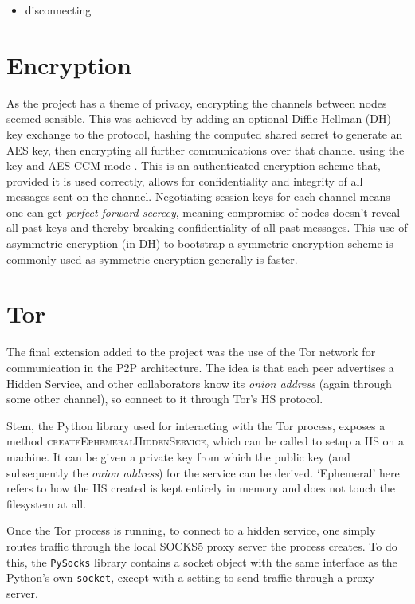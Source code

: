 \documentclass[diss.tex]{subfiles}
\begin{document}
\begin{itemize}
\item disconnecting
\end{itemize}

\section{Encryption}
As the project has a theme of privacy, encrypting the channels between nodes seemed sensible. This was achieved by adding an optional Diffie-Hellman (DH) key exchange \cite{DH} to the protocol, hashing the computed shared secret to generate an AES key, then encrypting all further communications over that channel using the key and AES CCM mode \cite{aesccm}. This is an authenticated encryption scheme that, provided it is used correctly, allows for confidentiality and integrity of all messages sent on the channel. Negotiating session keys for each channel means one can get \textit{perfect forward secrecy}, meaning compromise of nodes doesn't reveal all past keys and thereby breaking confidentiality of all past messages. This use of asymmetric encryption (in DH) to bootstrap a symmetric encryption scheme is commonly used as symmetric encryption generally is faster.



\section{Tor}

The final extension added to the project was the use of the Tor network for communication in the P2P architecture. The idea is that each peer advertises a Hidden Service, and other collaborators know its \textit{onion address} (again through some other channel), so connect to it through Tor's HS protocol. 

Stem, the Python library used for interacting with the Tor process, exposes a method \textsc{createEphemeralHiddenService}, which can be called to setup a HS on a machine. It can be given a private key from which the public key (and subsequently the \textit{onion address}) for the service can be derived. `Ephemeral' here refers to how the HS created is kept entirely in memory and does not touch the filesystem at all. 

Once the Tor process is running, to connect to a hidden service, one simply routes traffic through the local SOCKS5 proxy server the process creates. To do this, the \texttt{PySocks} library contains a socket object with the same interface as the Python's own \texttt{socket}, except with a setting to send traffic through a proxy server.
\end{document}
